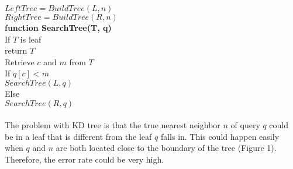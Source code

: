 \documentclass[paper=letter, fontsize=12pt]{article} %
\begin{document}
\hspace*{2em} $LeftTree = BuildTree(L, n)$\\
\hspace*{2em} $RightTree = BuildTree(R, n)$\\
\hspace*{1em} \textbf{function SearchTree(T, q)}\\
\hspace*{2em} If $T$ is leaf\\
\hspace*{3em} return $T$\\
\hspace*{2em} Retrieve $c$ and $m$ from $T$\\
\hspace*{2em} If $q[c] < m$\\
\hspace*{3em} $SearchTree(L, q)$\\
\hspace*{2em} Else\\
\hspace*{3em} $SearchTree(R, q)$
\\~\\
\hspace*{2em} The problem with KD tree is that the true nearest neighbor $n$ of query $q$ could be in a leaf that is different from the leaf $q$ falls in. This could happen easily when $q$ and $n$ are both located close to the boundary of the tree (Figure 1). Therefore, the error rate could be very high.
\end{document}
